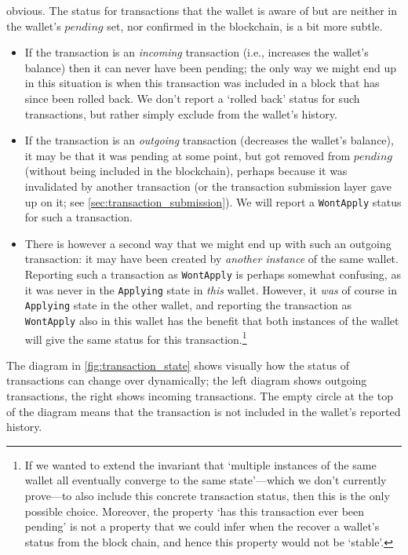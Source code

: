 \documentclass{article}
\theoremstyle{definition}{
  \newtheorem{lemma}{Lemma}[section] %
  \newtheorem{definition}[lemma]{Definition}
}
\theoremstyle{theorem}{
  \newtheorem{invariant}[lemma]{Invariant}
  \newtheorem{proofobligation}[lemma]{Proof Obligation}
}
\numberwithin{equation}{lemma}
\begin{document}
obvious. The status for transactions that the wallet is aware of but
are neither in the wallet's $\mathit{pending}$ set, nor confirmed in the
blockchain, is a bit more subtle.
%
\begin{itemize}
\item If the transaction is an \emph{incoming} transaction (i.e., increases
the wallet's balance) then it can never have been pending; the only way we might
end up in this situation is when this transaction was included in a block that
has since been rolled back. We don't report a `rolled back' status for such
transactions, but rather simply exclude from the wallet's history.
\item If the transaction is an \emph{outgoing} transaction (decreases the
wallet's balance), it may be that it was pending at some point, but got removed
from $\mathit{pending}$ (without being included in the blockchain), perhaps
because it was invalidated by another transaction (or the transaction submission
layer gave up on it; see \cref{sec:transaction_submission}). We will
report a \texttt{WontApply} status for such a transaction.
\item There is however a second way that we might end up with such an
outgoing transaction: it may have been created by \emph{another instance} of the
same wallet. Reporting such a transaction as \texttt{WontApply} is perhaps
somewhat confusing, as it was never in the \texttt{Applying} state in
\emph{this} wallet. However, it \emph{was} of course in \texttt{Applying} state
in the other wallet, and reporting the transaction as \texttt{WontApply} also in
this wallet has the benefit that both instances of the wallet will give the same
status for this transaction.\footnote{If we wanted to extend the invariant that
`multiple instances of the same wallet all eventually converge to the same state'---which we don't currently prove---to
also include this concrete transaction status, then this is the only possible
choice. Moreover, the property `has this transaction ever been pending' is not
a property that we could infer when the recover a wallet's status from the block
chain, and hence this property would not be `stable'.}
\end{itemize}
%
The diagram in \cref{fig:transaction_state} shows visually how the status of
transactions can change over dynamically; the left diagram shows outgoing
transactions, the right shows incoming transactions. The empty circle at the top
of the diagram means that the transaction is not included in the wallet's
reported history.
\end{document}

